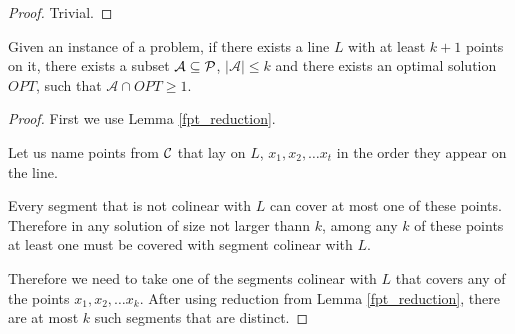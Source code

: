 \begin{proof} Trivial. \end{proof}

\begin{lemma}
	\label{fpt_long_lines}
	Given an instance of a problem, if there exists a line $L$ with at least
	$k+1$ points on it, there exists a subset $\mathcal{A} \subseteq \mathcal{P}$,
	$|\mathcal{A}| \le k$ and there exists an optimal solution
	$OPT$, such that $\mathcal{A} \cap OPT \ge 1$.
\end{lemma}

\begin{proof}

First we use Lemma \ref{fpt_reduction}.

Let us name points from $\mathcal{C}$ that lay on $L$, $x_1, x_2, \ldots x_t$
in the order they appear on the line.

Every segment that is not colinear with $L$ can cover at most one of these
points. Therefore in any solution of size not larger thann $k$,
among any $k$ of these points at least one must
be covered with segment colinear with $L$.

Therefore we need to take one of the segments colinear
with $L$ that covers any of the points
$x_1, x_2, \ldots x_k$. After using reduction from Lemma \ref{fpt_reduction},
there are at most $k$ such segments that are distinct.

\end{proof}



